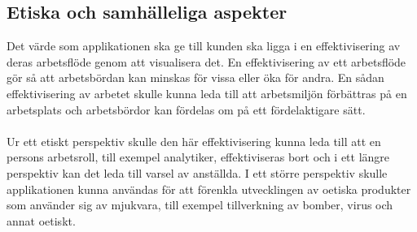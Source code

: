 \subsection{Etiska och samhälleliga aspekter}
\label{sec:ethical-aspects}
Det värde som applikationen ska ge till kunden ska ligga i en effektivisering av deras arbetsflöde genom att visualisera det. En effektivisering av ett arbetsflöde gör så att arbetsbördan kan minskas för vissa eller öka för andra. En sådan effektivisering av arbetet skulle kunna leda till att arbetsmiljön förbättras på en arbetsplats och arbetsbördor kan fördelas om på ett fördelaktigare sätt.
\\ \\
Ur ett etiskt perspektiv skulle den här effektivisering kunna leda till att en persons arbetsroll, till exempel analytiker, effektiviseras bort och i ett längre perspektiv kan det leda till varsel av anställda. I ett större perspektiv skulle applikationen kunna användas för att förenkla utvecklingen av oetiska produkter som använder sig av mjukvara, till exempel tillverkning av bomber, virus och annat oetiskt.


